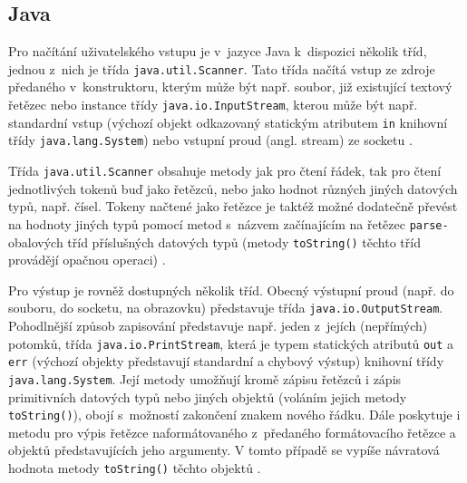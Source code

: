 \documentclass[onepage, a4paper, 12pt]{bakalarka}
\begin{document}
\subsection{Java}
Pro načítání uživatelského vstupu je v~jazyce Java k~dispozici několik tříd, jednou z~nich je třída \texttt{java.util.Scanner}. Tato třída načítá vstup ze zdroje předaného v~konstruktoru, kterým může být např. soubor, již existující textový řetězec nebo instance třídy \texttt{java.io.InputStream}, kterou může být např. standardní vstup (výchozí objekt odkazovaný statickým atributem \texttt{in} knihovní třídy \texttt{java.lang.System}) nebo vstupní proud (angl. stream) ze socketu \cite{java-guide-scanner, java-guide-inputstream, java-guide-system}.\par
Třída \texttt{java.util.Scanner} obsahuje metody jak pro čtení řádek, tak pro čtení jednotlivých tokenů buď jako řetězců, nebo jako hodnot různých jiných datových typů, např. čísel. Tokeny načtené jako řetězce je taktéž možné dodatečně převést na hodnoty jiných typů pomocí metod s~názvem začínajícím na řetězec \texttt{parse-} obalových tříd příslušných datových typů (metody \texttt{toString()} těchto tříd provádějí opačnou operaci) \cite{java-guide-scanner, java-guide-byte, java-guide-short, java-guide-integer, java-guide-long, java-guide-float, java-guide-double, java-guide-boolean, java-guide-character}.\par
Pro výstup je rovněž dostupných několik tříd. Obecný výstupní proud (např. do souboru, do socketu, na obrazovku) představuje třída \texttt{java.io\-.OutputStream}. Pohodlnější způsob zapisování představuje např. jeden z~jejích (nepřímých) potomků, třída \texttt{java.io.PrintStream}, která je typem statických atributů \texttt{out} a \texttt{err} (výchozí objekty představují standardní a chybový výstup) knihovní třídy \texttt{java.lang.System}. Její metody umožňují kromě zápisu řetězců i zápis primitivních datových typů nebo jiných objektů (voláním jejich metody \texttt{toString()}), obojí s~možností zakončení znakem nového řádku. Dále poskytuje i metodu pro výpis řetězce naformátovaného z~předaného formátovacího řetězce a objektů představujících jeho argumenty. V tomto případě se vypíše návratová hodnota metody \texttt{toString()} těchto objektů \cite{java-guide-outputstream, java-guide-printstream, java-guide-system}.
\end{document}
